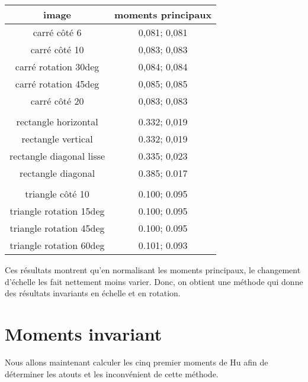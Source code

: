 \documentclass{article}
\begin{document}
   \begin{center}
    \begin{tabular}{|c|c|}
      \hline
      \textbf{image} & \textbf{moments principaux} \\
      \hline
      carré côté 6 & 0,081; 0,081 \\
      \hline
      carré côté 10 & 0,083; 0,083 \\
      \hline
      carré rotation 30deg & 0,084; 0,084 \\
      \hline
      carré rotation 45deg & 0,085; 0,085 \\
      \hline
      carré côté 20 & 0,083; 0,083 \\
      \hline
       & \\
      \hline
      rectangle horizontal & 0.332; 0,019 \\
      \hline
      rectangle vertical & 0.332; 0,019 \\
      \hline
      rectangle diagonal lisse & 0.335; 0,023 \\
      \hline
      rectangle diagonal & 0.385; 0.017 \\
      \hline
       & \\
      \hline
      triangle côté 10 & 0.100; 0.095\\
      \hline
      triangle rotation 15deg & 0.100; 0.095\\
      \hline
      triangle rotation 45deg & 0.100; 0.095\\
      \hline
      triangle rotation 60deg & 0.101; 0.093\\
      \hline
    \end{tabular}
  \end{center}
  
  Ces résultats montrent qu'en normalisant les moments principaux, le changement d'échelle les 
  fait nettement moins varier. Donc, on obtient une méthode qui donne des résultats invariants 
  en échelle et en rotation.\\
  
  \section{Moments invariant}
  Nous allons maintenant calculer les cinq premier moments de Hu afin de déterminer les atouts
  et les inconvénient de cette méthode.
  
\end{document}
